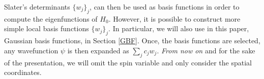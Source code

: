\documentclass[11pt]{elsarticle}
\let \leq \leqslant
\let \epsilon \varepsilon
\begin{document}
 Slater's determinants $\{w_j\}_j$, can then be used as basis functions in order to compute the eigenfunctions of $H_0$. However, it is possible to construct more simple local basis functions $\{w_j\}_j$. In particular, we will also use in this paper, Gaussian basis functions, in Section \ref{GBF}. Once, the basis functions are selected, any wavefunction $\psi$ is then expanded as $\sum_{j} c_jw_j$. {\it From now on} and for the sake of the presentation, we will omit the spin variable and only consider the spatial coordinates.
\end{document}
